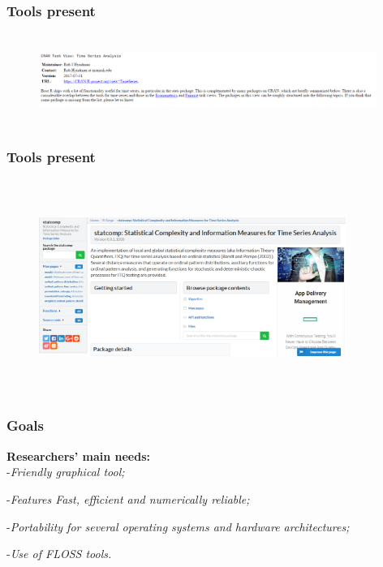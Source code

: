 \documentclass[10pt, compress]{beamer}
\begin{document}
\begin{frame}[fragile]
\frametitle{Tools present}

\begin{figure}
  \centering
   \includegraphics[width=11cm,height=3cm]{CRAN.png}
\end{figure}
\end{frame}

\begin{frame}[fragile]
\frametitle{Tools present}

\begin{figure}
  \centering
   \includegraphics[width=10cm,height=7cm]{statcomp.png}
\end{figure}
\end{frame}

\begin{frame}[fragile]
\frametitle{Goals}
 
\textbf{\Large Researchers' main needs:}\\

-\textit{Friendly graphical tool;}

-\textit{Features
Fast, efficient and numerically reliable;} 

-\textit{Portability for several
operating systems and hardware architectures;}

-\textit{Use of FLOSS tools.} 

\end{frame}
\end{document}
